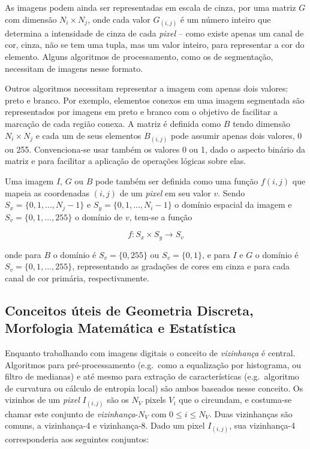 As imagens podem ainda ser representadas em escala de cinza, por uma
matriz $G$ com dimensão $N_i \times N_j$, onde cada valor $G_{(i,j)}$
é um número inteiro que determina a intensidade de cinza de cada
\textit{pixel} -- como existe apenas um canal de cor, cinza, não se
tem uma tupla, mas um valor inteiro, para representar a cor do
elemento. Alguns algoritmos de processamento, como os de segmentação,
necessitam de imagens nesse formato.

Outros algoritmos necessitam representar a imagem com apenas dois
valores: preto e branco. Por exemplo, elementos conexos em uma imagem
segmentada são representados por imagens em preto e branco com o
objetivo de facilitar a marcação de cada região conexa. A matriz é
definida como $B$ tendo dimensão $N_i \times N_j$ e cada um de seus
elementos $B_{(i,j)}$ pode assumir apenas dois valores, 0 ou
255. Convenciona-se usar também os valores 0 ou 1, dado o aspecto
binário da matriz e para facilitar a aplicação de operações lógicas
sobre elas.

Uma imagem $I$, $G$ ou $B$ pode também ser definida como uma função
$f(i,j)$ que mapeia as coordenadas $(i,j)$ de um \textit{pixel} em seu
valor $v$. Sendo $S_x = \{0, 1, ..., N_j - 1\}$ e $S_y = \{0, 1, ...,
N_i - 1\}$ o domínio espacial da imagem e $S_v = \{0, 1, ..., 255\}$ o
domínio de $v$, tem-se a função

\begin{equation}
  f : S_x \times S_y \to S_v
\end{equation}

\noindent onde para $B$ o domínio é $S_v = \{0, 255\}$ ou $S_v = \{0,
1\}$, e para $I$ e $G$ o domínio é $S_v = \{0, 1, ..., 255\}$,
representando as gradações de cores em cinza e para cada canal de cor
primária, respectivamente.

\subsection{Conceitos úteis de Geometria Discreta, Morfologia Matemática e Estatística}

Enquanto trabalhando com imagens digitais o conceito de
\emph{vizinhança} é central.~\cite{luciano} Algoritmos para
pré-processamento (e.g.\ como a equalização por histograma, ou filtro
de medianas) e até mesmo para extração de características
(e.g.\ algoritmo de curvatura ou cálculo de entropia local) são ambos
baseados nesse conceito. Os vizinhos de um \textit{pixel} $I_{(i,j)}$
são os $N_V$ pixels $V_i$ que o circundam, e costuma-se chamar este
conjunto de \emph{vizinhança}-$N_V$ com $0 \leq i \leq N_V$. Duas
vizinhanças são comuns, a vizinhança-4 e vizinhança-8. Dado um pixel
$I_{(i,j)}$, sua vizinhança-4 corresponderia aos seguintes conjuntos:

